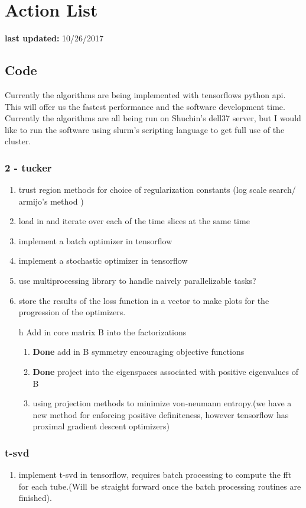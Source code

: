 \documentclass{report}
\begin{document}
\section{Action List}
	\textbf{last updated:} 10/26/2017
	\subsection{Code}
		Currently the algorithms are being implemented with tensorflows python api. This will offer us the fastest performance and the software development time. Currently the algorithms are all being run on Shuchin's dell37 server, but I would like to run the software using slurm's scripting language to get full use of the cluster. 
		\subsubsection{2 - tucker}
			\begin{enumerate}
				\item trust region methods for choice of regularization constants (log scale search/ armijo's method )
				\item load in and iterate over each of the time slices at the same time
				\item implement a batch optimizer in tensorflow
				\item implement a stochastic optimizer in tensorflow
				\item use multiprocessing library to handle naively parallelizable tasks?
				\item store the results of the loss function in a vector to make plots for the progression of the optimizers.
				\item[h] Add in core matrix B into the factorizations
				\begin{enumerate}
					\item \textbf{Done} add in B symmetry encouraging objective functions
					\item \textbf{Done} project into the eigenspaces associated with positive eigenvalues of B
					\item using projection methods to minimize von-neumann entropy.(we have a new method for enforcing positive definiteness, however tensorflow has proximal gradient descent optimizers)
				\end{enumerate}
			\end{enumerate}
		\subsubsection{t-svd}
			\begin{enumerate}
				\item implement t-svd in tensorflow, requires batch processing to compute the fft for each tube.(Will be straight forward once the batch processing routines are finished).
			\end{enumerate}
\end{document}
